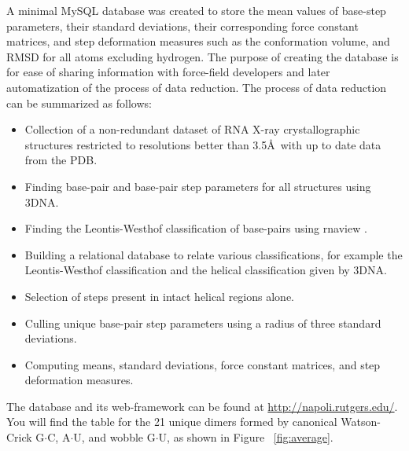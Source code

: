 A  minimal MySQL  database was  created to  store the  mean  values of
base-step parameters,  their standard deviations,  their corresponding
force  constant matrices, and  step deformation  measures such  as the
conformation volume, and RMSD for all atoms excluding hydrogen. The
purpose of creating the database is
for ease of sharing  information with force-field developers and later
automatization of the process of  data reduction.  The process of data
reduction can be summarized as follows:
\begin{itemize}
\item{Collection of a non-redundant dataset of RNA X-ray crystallographic
  structures restricted to resolutions better than 3.5\AA~with up to
  date data from the PDB.}
\item{Finding base-pair and base-pair step parameters for all structures
  using 3DNA.}
\item{Finding the Leontis-Westhof classification of base-pairs using
  rnaview \cite{yang2003}.}
\item{Building a relational database to relate various classifications,
  for example the Leontis-Westhof classification and the helical
  classification given by 3DNA.}
\item{Selection of steps present in intact helical regions alone.}
\item{Culling unique base-pair step parameters using a radius of three
  standard deviations.}
\item{Computing means, standard deviations, force constant matrices, and
step deformation measures.}  
\end{itemize}  

The    database   and    its   web-framework    can   be    found   at
\url{http://napoli.rutgers.edu/}. You  will find the table  for the 21
unique dimers  formed by canonical  Watson-Crick G$\cdot$C, A$\cdot$U,
and wobble G$\cdot$U, as shown in Figure ~\ref{fig:average}.

